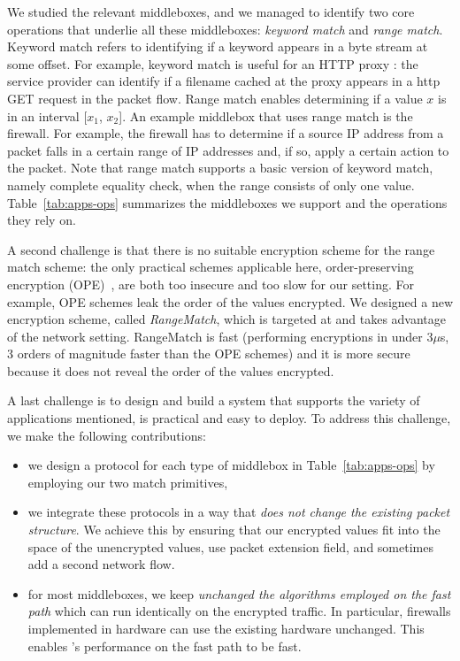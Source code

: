 We studied the relevant middleboxes, and we managed to identify two core operations that underlie all these middleboxes: {\em keyword match} and {\em range match}. Keyword match refers to  identifying if a keyword appears in a byte stream at some offset.   For example, keyword match is useful for an HTTP proxy : the service provider can identify if a filename cached at the proxy appears in a http GET request in the packet flow. %
Range match enables determining if a value $x$ is in an interval [$x_1$, $x_2$]. An example middlebox that uses range match is the firewall.   For example, the firewall has to determine if a source IP address from a packet falls in a certain range of IP addresses and, if so, apply a certain action to the packet.  Note that range match supports a basic version of keyword match, namely complete equality check, when the range consists of only one value.
%
Table~\ref{tab:apps-ops} summarizes the middleboxes we support and the operations they rely on. 


A second challenge is that there is no suitable encryption scheme for the range match scheme:
 the only practical schemes applicable here, order-preserving encryption (OPE)~\cite{boldyreva:ope,popa:mope}, are both too insecure and too slow for our setting.  For example, OPE schemes leak the order of the values encrypted. We designed a new encryption scheme, called {\em RangeMatch}, which is targeted at and takes advantage of the network setting. RangeMatch  is fast (performing encryptions in under 3$\mu$s, 3 orders of magnitude faster than the OPE schemes) and it is more secure because it does not reveal the order of the values encrypted. 
 
A last challenge is to design and build a system that supports the variety of applications mentioned, is practical and easy to deploy. 
To address this challenge, we make the following contributions:
\begin{itemize}
\item we design a  protocol for each type of middlebox in Table~\ref{tab:apps-ops} by employing our two match  primitives,
\item  we integrate these protocols in a way that {\em does not change the existing packet structure}. We achieve this by ensuring that our encrypted values fit into the space of the unencrypted values, use packet extension field, and sometimes add a second network flow.
\item  for most middleboxes, we keep {\em unchanged  the algorithms employed on the fast path} which can run identically on the encrypted traffic. In particular, firewalls implemented in hardware can use the existing hardware unchanged.  This enables \sys's performance on the fast path to be fast. 
\end{itemize}




